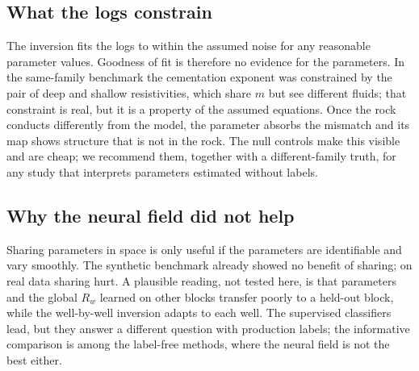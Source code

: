 \documentclass[preprint,12pt]{elsarticle}
\begin{document}
\subsection{What the logs constrain}
The inversion fits the logs to within the assumed noise for any reasonable parameter values.
Goodness of fit is therefore no evidence for the parameters. In the same-family benchmark the
cementation exponent was constrained by the pair of deep and shallow resistivities, which share
$m$ but see different fluids; that constraint is real, but it is a property of the assumed
equations. Once the rock conducts differently from the model, the parameter absorbs the
mismatch and its map shows structure that is not in the rock. The null controls make this
visible and are cheap; we recommend them, together with a different-family truth, for any study
that interprets parameters estimated without labels.

\subsection{Why the neural field did not help}
Sharing parameters in space is only useful if the parameters are identifiable and vary smoothly.
The synthetic benchmark already showed no benefit of sharing; on real data sharing hurt. A
plausible reading, not tested here, is that parameters and the global $R_w$ learned on other
blocks transfer poorly to a held-out block, while the well-by-well inversion adapts to each
well. The supervised classifiers lead, but they answer a different question with production
labels; the informative comparison is among the label-free methods, where the neural field
is not the best either.
\end{document}
